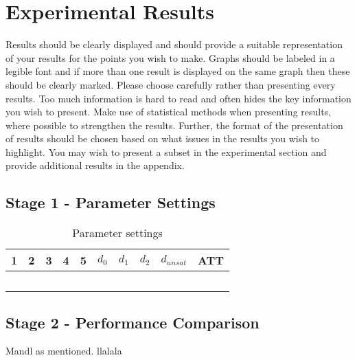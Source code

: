 \section{Experimental Results}

Results should be clearly displayed and should provide a suitable representation of your results for the points you wish to make. Graphs should be labeled in a legible font and if more than one result is displayed on the same graph then these should be clearly marked.   Please choose carefully rather than presenting every results. Too much information is hard to read and often hides the key information you wish to present. Make use of statistical methods when presenting results, where possible to strengthen the results.  Further, the format of the presentation of results should be chosen based on what issues in the results you wish to highlight. You may wish to present a subset in the experimental section and provide additional results in the appendix.


\subsection{Stage 1 - Parameter Settings}

\begin{table}[H]
\centering
    \begin{tabular}{|l|l|l|l|l||l|l|l|l|l|}

 	\hline
 	1 & 2 & 3 & 4 & 5 & $d_0$ & $d_1$ & $d_2$ & $d_{unsat}$ & ATT \\
 	\hline
    ~ & ~ & ~ & ~ & ~ & ~ & ~ & ~ & ~ & ~ \\

	\hline
    \end{tabular}
    \caption {Parameter settings}
    \label{table:parameterSettings}

\end{table}

\subsection{Stage 2 - Performance Comparison}

Mandl as mentioned. llalala